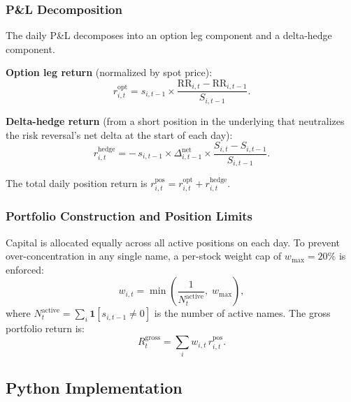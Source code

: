 \documentclass[12pt, a4paper]{article}
\begin{document}
\subsubsection{P\&L Decomposition}

The daily P\&L decomposes into an option leg component and a delta-hedge component.

\textbf{Option leg return} (normalized by spot price):
\begin{equation}
    r^{\mathrm{opt}}_{i,t}
    = s_{i,t-1}
      \times \frac{\mathrm{RR}_{i,t} - \mathrm{RR}_{i,t-1}}{S_{i,t-1}}.
    \label{eq:opt_ret}
\end{equation}

\textbf{Delta-hedge return} (from a short position in the underlying that neutralizes the risk reversal's net delta at the start of each day):
\begin{equation}
    r^{\mathrm{hedge}}_{i,t}
    = -\,s_{i,t-1}
      \times \Delta^{\mathrm{net}}_{i,t-1}
      \times \frac{S_{i,t} - S_{i,t-1}}{S_{i,t-1}}.
    \label{eq:hedge_ret}
\end{equation}

The total daily position return is $r^{\mathrm{pos}}_{i,t} = r^{\mathrm{opt}}_{i,t} + r^{\mathrm{hedge}}_{i,t}$.

\subsubsection{Portfolio Construction and Position Limits}

Capital is allocated equally across all active positions on each day. To prevent over-concentration in any single name, a per-stock weight cap of $w_{\max} = 20\%$ is enforced:
\begin{equation}
    w_{i,t} = \min\!\left(\frac{1}{N_t^{\mathrm{active}}},\; w_{\max}\right),
    \label{eq:weight}
\end{equation}
where $N_t^{\mathrm{active}} = \sum_i \mathbf{1}[s_{i,t-1} \neq 0]$ is the number of active names. The gross portfolio return is:
\begin{equation}
    R_t^{\mathrm{gross}} = \sum_i w_{i,t}\,r^{\mathrm{pos}}_{i,t}.
    \label{eq:gross_return}
\end{equation}

\subsection{Python Implementation}
\label{sec:python}
\end{document}
